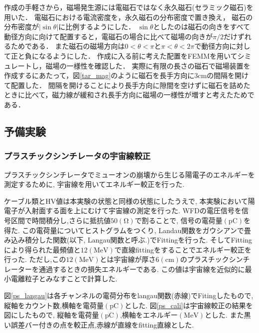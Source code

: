作成の手軽さから，磁場発生源には電磁石ではなく永久磁石(セラミック磁石)を用いた．
電磁石における電流密度を，永久磁石の分布密度で置き換え，
磁石の分布密度が$|\sin\theta|$に比例するようにした．
$\sin\theta$としたのは磁石の向きをすべて動径方向に向けて配置すると，電磁石の場合に比べて磁場の向きが$\pi/2$だけずれるためである．
また磁石の磁場方向は$0<\theta<\pi$と$\pi<\theta<2\pi$で動径方向に対して正と負になるようにした．
作成に入る前に考えた配置をFEMMを用いてシミュレートし，磁場の一様性を確認した．
実際に有限の長さの磁石で磁場装置を作成するにあたって，図\ref{tar_mag}のように磁石を長手方向に$3\mathrm{cm}$の間隔を開けて配置した．
間隔を開けることにより長手方向に隙間を空けずに磁石を詰めたときに比べて，磁力線が緩和され長手方向に磁場の一様性が増すと考えたためである．

\newpage
\subsection{予備実験}
\subsubsection{プラスチックシンチレータの宇宙線較正}
プラスチックシンチレータでミューオンの崩壊から生じる陽電子のエネルギーを測定するために, 宇宙線を用いてエネルギー較正を行った.

ケーブル類とHV値は本実験の状態と同様の状態にしたうえで,
本実験において陽電子が入射面する面を上にむけて宇宙線の測定を行った.
WFDの電圧信号を信号区間で時間積分し,さらに抵抗値$50(\mathrm{\Omega})$で割ることで,
信号の電荷量$(\mathrm{pC})$を得た.
この電荷量についてヒストグラムをつくり, Landau関数をガウシアンで畳み込み積分した関数(以下, Langau関数と呼ぶ.)でFittingを行った.
そしてFittingにより得られた最頻値と$12(\mathrm{MeV})$で直線fittingをすることでエネルギー較正を行った.
ただし,この$12(\mathrm{MeV})$とは宇宙線が厚さ$6(\mathrm{cm})$のプラスチックシンチレーターを通過するときの損失エネルギーである.
この値は宇宙線を近似的に最小電離粒子とみなすことで計算した.\cite{leo}

図\ref{ps_langau}は各チャンネルの電荷分布をlangau関数(赤線)でFitingしたもので,
縦軸をカウント数,横軸を電荷量$(\mathrm{pC})$とした.
図\ref{ps_cali}は宇宙線較正の結果を図にしたもので,
縦軸を電荷量$(\mathrm{pC})$,横軸をエネルギー$(\mathrm{MeV})$とした.
また黒い誤差バー付きの点を較正点,赤線が直線をfitting直線とした.

